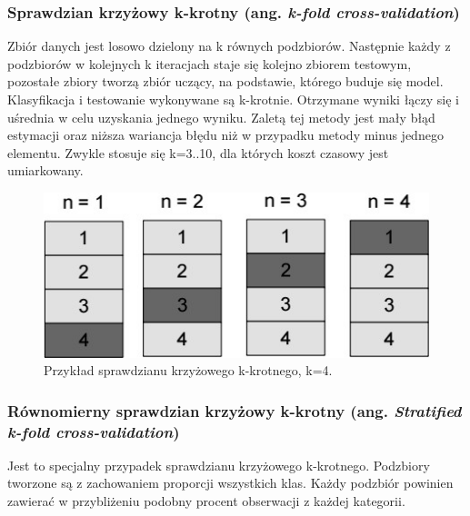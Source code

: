 \subsubsection{Sprawdzian krzyżowy k-krotny (ang. \textit{k-fold cross-validation})}
Zbiór danych jest losowo dzielony na k równych podzbiorów. Następnie każdy z podzbiorów w kolejnych k iteracjach staje się kolejno zbiorem testowym, pozostałe zbiory tworzą zbiór uczący, na podstawie, którego buduje się model. Klasyfikacja i testowanie wykonywane są k-krotnie. Otrzymane wyniki łączy się i uśrednia w celu uzyskania jednego wyniku. Zaletą tej metody jest mały błąd estymacji oraz niższa wariancja błędu niż w przypadku metody minus jednego elementu. Zwykle stosuje się k=3..10, dla których koszt czasowy jest umiarkowany.
\begin{figure}[h]
	\centering
	\includegraphics[width=\linewidth]{./images/crossvalidation.jpg}
	\caption{Przykład sprawdzianu krzyżowego k-krotnego, k=4.}
	\label{fig:sprawdziankrzyzowy}
\end{figure}

\subsubsection{Równomierny sprawdzian krzyżowy k-krotny (ang. \textit{Stratified k-fold cross-validation})}
Jest to specjalny przypadek sprawdzianu krzyżowego k-krotnego. Podzbiory tworzone są z zachowaniem proporcji wszystkich klas. Każdy podzbiór powinien zawierać w przybliżeniu podobny procent obserwacji z każdej kategorii.


